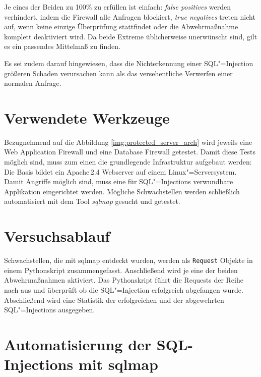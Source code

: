 Je eines der Beiden zu 100\% zu erfüllen ist einfach: \emph{false positives} werden verhindert, indem die Firewall alle Anfragen blockiert, \emph{true negatives} treten nicht auf, wenn keine einzige Überprüfung stattfindet oder die Abwehrmaßnahme komplett deaktiviert wird. Da beide Extreme üblicherweise unerwünscht sind, gilt es ein passendes Mittelmaß zu finden.

Es sei zudem darauf hingewiesen, dass die Nichterkennung einer SQL"=Injection größeren Schaden verursachen kann als das versehentliche Verwerfen einer normalen Anfrage.

\section{Verwendete Werkzeuge}

Bezugnehmend auf die Abbildung \ref{img:protected_server_arch} wird jeweils eine Web Application Firewall und eine Database Firewall getestet. Damit diese Tests möglich sind, muss zum einen die grundlegende Infrastruktur aufgebaut werden: Die Basis bildet ein Apache\,2.4 Webserver auf einem Linux"=Serversystem. Damit Angriffe möglich sind, muss eine für SQL"=Injections verwundbare Applikation eingerichtet werden. Mögliche Schwachstellen werden schließlich automatisiert mit dem Tool \emph{sqlmap} gesucht und getestet.

\section{Versuchsablauf}

Schwachstellen, die mit sqlmap entdeckt wurden, werden als \texttt{Request} Objekte in einem Pythonskript zusammengefasst. Anschließend wird je eine der beiden Abwehrmaßnahmen aktiviert. Das Pythonskript führt die Requests der Reihe nach aus und überprüft ob die SQL"=Injection erfolgreich abgefangen wurde. Abschließend wird eine Statistik der erfolgreichen und der abgewehrten SQL"=Injections ausgegeben.


\section{Automatisierung der SQL-Injections mit sqlmap}

